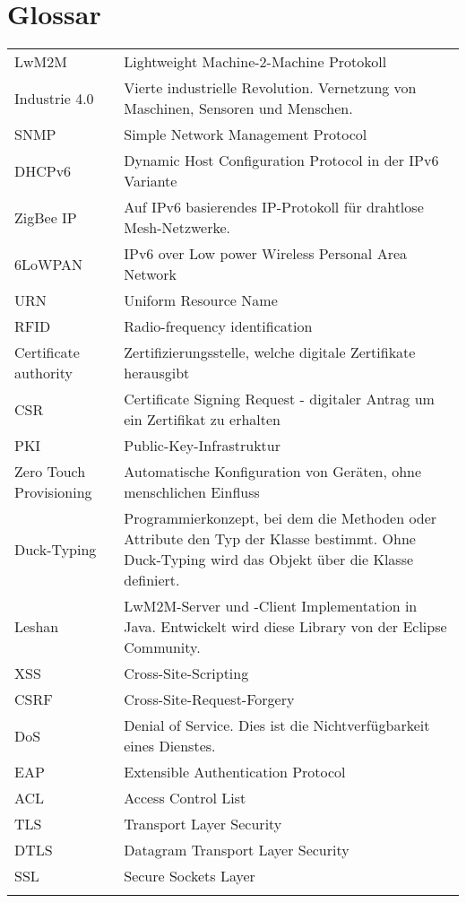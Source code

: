 \chapter{Glossar}
\begin{table}[H]
\centering
\begin{tabular}{@{} p{5cm} p{10cm}}    
LwM2M &   Lightweight Machine-2-Machine Protokoll \\ \addlinespace
Industrie 4.0 &  Vierte industrielle Revolution. Vernetzung von  Maschinen, Sensoren und Menschen.  \\ \addlinespace
SNMP &  Simple Network Management Protocol  \\ \addlinespace
DHCPv6 &    Dynamic Host Configuration Protocol in der IPv6 Variante\\ \addlinespace
ZigBee IP &   Auf IPv6 basierendes IP-Protokoll für drahtlose Mesh-Netzwerke. \\ \addlinespace
6LoWPAN &  IPv6 over Low power Wireless Personal Area Network \\ \addlinespace
URN &  Uniform Resource Name \\ \addlinespace
RFID &  Radio-frequency identification\\ \addlinespace
Certificate authority & Zertifizierungsstelle, welche digitale Zertifikate herausgibt  \\ \addlinespace
CSR &   Certificate Signing Request - digitaler Antrag um ein Zertifikat zu erhalten\\ \addlinespace
PKI &  Public-Key-Infrastruktur \\ \addlinespace
Zero Touch Provisioning & Automatische Konfiguration von Geräten, ohne menschlichen Einfluss  \\ \addlinespace
Duck-Typing &  Programmierkonzept, bei dem die Methoden oder Attribute den Typ der Klasse bestimmt. Ohne Duck-Typing wird das Objekt über die Klasse definiert. \\ \addlinespace
Leshan &  LwM2M-Server und -Client Implementation in Java. Entwickelt wird diese Library von der Eclipse Community. \\ \addlinespace
XSS &  Cross-Site-Scripting \\ \addlinespace
CSRF & Cross-Site-Request-Forgery  \\ \addlinespace
DoS & Denial of Service. Dies ist die Nichtverfügbarkeit eines Dienstes.\\ \addlinespace
EAP &  Extensible Authentication Protocol \\ \addlinespace
ACL & Access Control List \\ \addlinespace
TLS & Transport Layer Security \\ \addlinespace
DTLS & Datagram Transport Layer Security \\ \addlinespace
SSL & Secure Sockets Layer \\ \addlinespace
\end{tabular}
\end{table} 